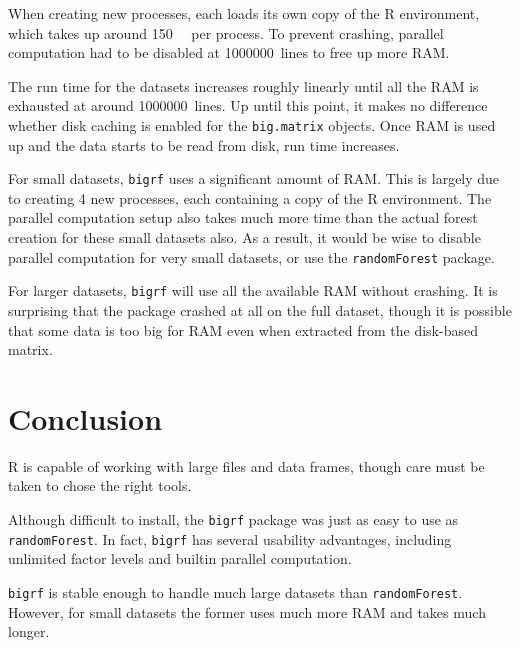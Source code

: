 \documentclass{article}
\begin{document}
\FloatBarrier

When creating new processes, each loads its own copy of the R environment, which takes up around \SI{150}{\mega\byte} per process. To prevent crashing, parallel computation had to be disabled at \SI{1000000}{lines} to free up more RAM.

The run time for the datasets increases roughly linearly until all the RAM is exhausted at around \SI{1000000}{lines}. Up until this point, it makes no difference whether disk caching is enabled for the  \texttt{big.matrix} objects. Once RAM is used up and the data starts to be read from disk, run time increases.

For small datasets, \texttt{bigrf} uses a significant amount of RAM. This is largely due to creating 4 new processes, each containing a copy of the R environment. The parallel computation setup also takes much more time than the actual forest creation for these small datasets also. As a result, it would be wise to disable parallel computation for very small datasets, or use the \texttt{randomForest} package.

For larger datasets, \texttt{bigrf} will use all the available RAM without crashing. It is surprising that the package crashed at all on the full dataset, though it is possible that some data is too big for RAM even when extracted from the disk-based matrix.

\section{Conclusion}
R is capable of working with large files and data frames, though care must be taken to chose the right tools. 

Although difficult to install, the \texttt{bigrf} package was just as easy to use as \texttt{randomForest}. In fact, \texttt{bigrf} has several usability advantages, including unlimited factor levels and builtin parallel computation.

\texttt{bigrf} is stable enough to handle much large datasets than \texttt{randomForest}. However, for small datasets the former uses much more RAM and takes much longer.


\clearpage


\end{document}
